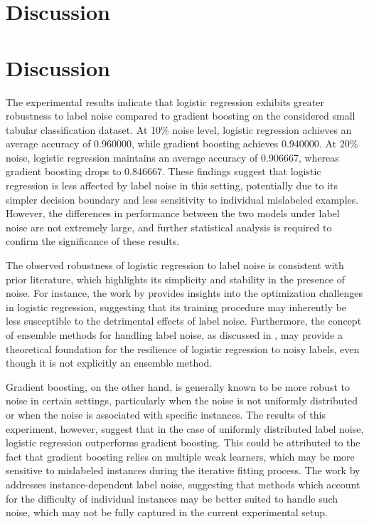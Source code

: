 \documentclass{article}
\begin{document}
\section{Discussion}
\section{Discussion}

The experimental results indicate that logistic regression exhibits greater robustness to label noise compared to gradient boosting on the considered small tabular classification dataset. At 10\% noise level, logistic regression achieves an average accuracy of 0.960000, while gradient boosting achieves 0.940000. At 20\% noise, logistic regression maintains an average accuracy of 0.906667, whereas gradient boosting drops to 0.846667. These findings suggest that logistic regression is less affected by label noise in this setting, potentially due to its simpler decision boundary and less sensitivity to individual mislabeled examples. However, the differences in performance between the two models under label noise are not extremely large, and further statistical analysis is required to confirm the significance of these results.

The observed robustness of logistic regression to label noise is consistent with prior literature, which highlights its simplicity and stability in the presence of noise. For instance, the work by \cite{2208.06828v2} provides insights into the optimization challenges in logistic regression, suggesting that its training procedure may inherently be less susceptible to the detrimental effects of label noise. Furthermore, the concept of ensemble methods for handling label noise, as discussed in \cite{2411.11020v2}, may provide a theoretical foundation for the resilience of logistic regression to noisy labels, even though it is not explicitly an ensemble method.

Gradient boosting, on the other hand, is generally known to be more robust to noise in certain settings, particularly when the noise is not uniformly distributed or when the noise is associated with specific instances. The results of this experiment, however, suggest that in the case of uniformly distributed label noise, logistic regression outperforms gradient boosting. This could be attributed to the fact that gradient boosting relies on multiple weak learners, which may be more sensitive to mislabeled instances during the iterative fitting process. The work by \cite{2012.11854v2} addresses instance-dependent label noise, suggesting that methods which account for the difficulty of individual instances may be better suited to handle such noise, which may not be fully captured in the current experimental setup.
\end{document}
